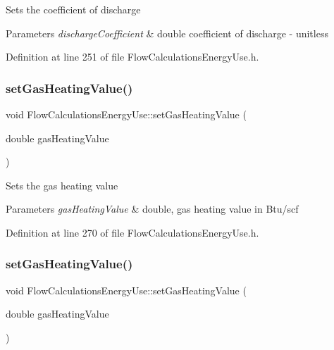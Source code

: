 Sets the coefficient of discharge


\begin{DoxyParams}{Parameters}
{\em discharge\+Coefficient} & double coefficient of discharge -\/ unitless \\
\hline
\end{DoxyParams}


Definition at line 251 of file Flow\+Calculations\+Energy\+Use.\+h.

\mbox{\label{class_flow_calculations_energy_use_ae51a954fb1f44d6b114f66e69bdf754e}} 
\subsubsection{\texorpdfstring{set\+Gas\+Heating\+Value()}{setGasHeatingValue()}\hspace{0.1cm}{\footnotesize\ttfamily [1/3]}}
{\footnotesize\ttfamily void Flow\+Calculations\+Energy\+Use\+::set\+Gas\+Heating\+Value (\begin{DoxyParamCaption}\item[{double}]{gas\+Heating\+Value }\end{DoxyParamCaption})\hspace{0.3cm}{\ttfamily [inline]}}

Sets the gas heating value


\begin{DoxyParams}{Parameters}
{\em gas\+Heating\+Value} & double, gas heating value in Btu/scf \\
\hline
\end{DoxyParams}


Definition at line 270 of file Flow\+Calculations\+Energy\+Use.\+h.

\mbox{\label{class_flow_calculations_energy_use_ae51a954fb1f44d6b114f66e69bdf754e}} 
\subsubsection{\texorpdfstring{set\+Gas\+Heating\+Value()}{setGasHeatingValue()}\hspace{0.1cm}{\footnotesize\ttfamily [2/3]}}
{\footnotesize\ttfamily void Flow\+Calculations\+Energy\+Use\+::set\+Gas\+Heating\+Value (\begin{DoxyParamCaption}\item[{double}]{gas\+Heating\+Value }\end{DoxyParamCaption})\hspace{0.3cm}{\ttfamily [inline]}}


